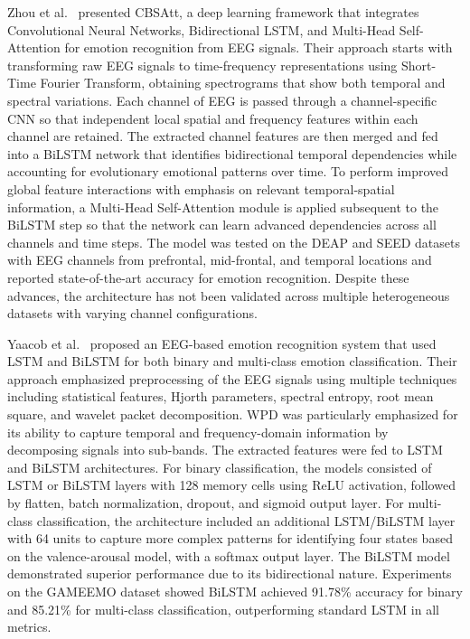 \documentclass[conference]{IEEEtran}
\begin{document}
Zhou et al.~\cite{zhou2025cbsatt} presented CBSAtt, a deep learning framework that integrates Convolutional Neural Networks, Bidirectional LSTM, and Multi-Head Self-Attention for emotion recognition from EEG signals. Their approach starts with transforming raw EEG signals to time-frequency representations using Short-Time Fourier Transform, obtaining spectrograms that show both temporal and spectral variations. Each channel of EEG is passed through a channel-specific CNN so that independent local spatial and frequency features within each channel are retained. The extracted channel features are then merged and fed into a BiLSTM network that identifies bidirectional temporal dependencies while accounting for evolutionary emotional patterns over time. To perform improved global feature interactions with emphasis on relevant temporal-spatial information, a Multi-Head Self-Attention module is applied subsequent to the BiLSTM step so that the network can learn advanced dependencies across all channels and time steps. The model was tested on the DEAP and SEED datasets with EEG channels from prefrontal, mid-frontal, and temporal locations and reported state-of-the-art accuracy for emotion recognition. Despite these advances, the architecture has not been validated across multiple heterogeneous datasets with varying channel configurations.

Yaacob et al.~\cite{yaacob2024accurate} proposed an EEG-based emotion recognition system that used LSTM and BiLSTM for both binary and multi-class emotion classification. Their approach emphasized preprocessing of the EEG signals using multiple techniques including statistical features, Hjorth parameters, spectral entropy, root mean square, and wavelet packet decomposition. WPD was particularly emphasized for its ability to capture temporal and frequency-domain information by decomposing signals into sub-bands. The extracted features were fed to LSTM and BiLSTM architectures. For binary classification, the models consisted of LSTM or BiLSTM layers with 128 memory cells using ReLU activation, followed by flatten, batch normalization, dropout, and sigmoid output layer. For multi-class classification, the architecture included an additional LSTM/BiLSTM layer with 64 units to capture more complex patterns for identifying four states based on the valence-arousal model, with a softmax output layer. The BiLSTM model demonstrated superior performance due to its bidirectional nature. Experiments on the GAMEEMO dataset showed BiLSTM achieved 91.78\% accuracy for binary and 85.21\% for multi-class classification, outperforming standard LSTM in all metrics.
\end{document}
